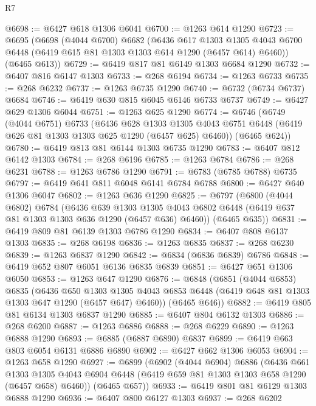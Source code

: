 \begin{lexlean}{R7}
\begin{coremodule}
@6698 := @6427 @618 @1306 @6041
@6700 := @1263 @614 @1290
@6723 := @6695
    (@6698
      (@4044 @6700)
      @6682
      (@6436
        @617
        @1303
        @1305
        @4043
        @6700
        @6448
        (@6419 @615 @81 @1303 @1303 @614 @1290 (@6457 @614) @6460))
      (@6465 @613))
@6729 := @6419 @817 @81 @6149 @1303 @6684 @1290
@6732 := @6407 @816 @6147 @1303
@6733 := @268 @6194
@6734 := @1263 @6733
@6735 := @268 @6232
@6737 := @1263 @6735 @1290
@6740 := @6732 (@6734 @6737) @6684
@6746 := @6419 @630 @815 @6045 @6146 @6733 @6737
@6749 := @6427 @629 @1306 @6044
@6751 := @1263 @625 @1290
@6774 := @6746
    (@6749
      (@4044 @6751)
      @6733
      (@6436
        @628
        @1303
        @1305
        @4043
        @6751
        @6448
        (@6419 @626 @81 @1303 @1303 @625 @1290 (@6457 @625) @6460))
      (@6465 @624))
@6780 := @6419 @813 @81 @6144 @1303 @6735 @1290
@6783 := @6407 @812 @6142 @1303
@6784 := @268 @6196
@6785 := @1263 @6784
@6786 := @268 @6231
@6788 := @1263 @6786 @1290
@6791 := @6783 (@6785 @6788) @6735
@6797 := @6419 @641 @811 @6048 @6141 @6784 @6788
@6800 := @6427 @640 @1306 @6047
@6802 := @1263 @636 @1290
@6825 := @6797
    (@6800
      (@4044 @6802)
      @6784
      (@6436
        @639
        @1303
        @1305
        @4043
        @6802
        @6448
        (@6419 @637 @81 @1303 @1303 @636 @1290 (@6457 @636) @6460))
      (@6465 @635))
@6831 := @6419 @809 @81 @6139 @1303 @6786 @1290
@6834 := @6407 @808 @6137 @1303
@6835 := @268 @6198
@6836 := @1263 @6835
@6837 := @268 @6230
@6839 := @1263 @6837 @1290
@6842 := @6834 (@6836 @6839) @6786
@6848 := @6419 @652 @807 @6051 @6136 @6835 @6839
@6851 := @6427 @651 @1306 @6050
@6853 := @1263 @647 @1290
@6876 := @6848
    (@6851
      (@4044 @6853)
      @6835
      (@6436
        @650
        @1303
        @1305
        @4043
        @6853
        @6448
        (@6419 @648 @81 @1303 @1303 @647 @1290 (@6457 @647) @6460))
      (@6465 @646))
@6882 := @6419 @805 @81 @6134 @1303 @6837 @1290
@6885 := @6407 @804 @6132 @1303
@6886 := @268 @6200
@6887 := @1263 @6886
@6888 := @268 @6229
@6890 := @1263 @6888 @1290
@6893 := @6885 (@6887 @6890) @6837
@6899 := @6419 @663 @803 @6054 @6131 @6886 @6890
@6902 := @6427 @662 @1306 @6053
@6904 := @1263 @658 @1290
@6927 := @6899
    (@6902
      (@4044 @6904)
      @6886
      (@6436
        @661
        @1303
        @1305
        @4043
        @6904
        @6448
        (@6419 @659 @81 @1303 @1303 @658 @1290 (@6457 @658) @6460))
      (@6465 @657))
@6933 := @6419 @801 @81 @6129 @1303 @6888 @1290
@6936 := @6407 @800 @6127 @1303
@6937 := @268 @6202

\end{coremodule}
\end{lexlean}
